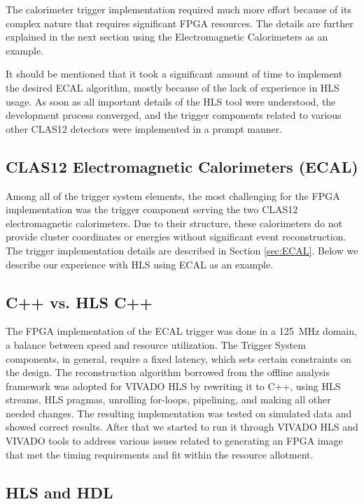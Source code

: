 The calorimeter trigger implementation required much more effort because of its complex nature that requires significant FPGA resources. The details are further explained in the next section using the Electromagnetic Calorimeters as an example.

It should be mentioned that it took a significant amount of time to implement the desired ECAL algorithm, mostly because of the lack of experience in HLS usage. As soon as all important details of the HLS tool were understood, the development process converged, and the trigger components related to various other CLAS12 detectors were implemented in a prompt manner.


\subsection{CLAS12 Electromagnetic Calorimeters (ECAL)}

Among all of the trigger system elements, the most challenging for the FPGA implementation was the trigger component serving the two CLAS12 electromagnetic calorimeters. Due to their structure, these calorimeters do not provide cluster coordinates or energies without significant event reconstruction. The trigger implementation details are described in Section \ref{sec:ECAL}. Below we describe our experience with HLS using ECAL as an example.


\subsection{C++ vs. HLS C++}

The FPGA implementation of the ECAL trigger was done in a 125~MHz domain, a balance between speed and resource utilization. The Trigger System components, in general, require a fixed latency, which sets certain constraints on the design. The reconstruction algorithm borrowed from the offline analysis framework was adopted for VIVADO HLS by rewriting it to C++, using HLS streams, HLS pragmas, unrolling for-loops, pipelining, and making all other needed changes. The resulting implementation was tested on simulated data and showed correct results. After that we started to run it through VIVADO HLS and VIVADO tools to address various issues related to generating an FPGA image that met the timing requirements and fit within the resource allotment.


\subsection{HLS and HDL}

